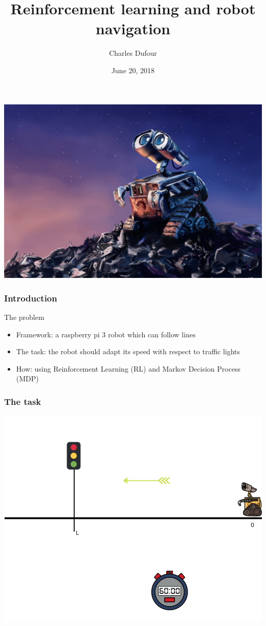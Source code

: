 \documentclass[dvipsnames,svgnames]{beamer}
\author{Charles Dufour}
\title{Reinforcement learning and robot navigation }
\institute{Supervisors: Prof. F. Eisenbrand, Jonas Racine}
\date{June 20, 2018}
\begin{document}
\begin{frame}
\titlepage
\centering
\includegraphics[scale=1]{img/Wall-E.jpg}
\end{frame}




\begin{frame}
\frametitle{Introduction}
\begin{block}{The problem}

  \begin{itemize}
   \item Framework: a raspberry pi 3 robot which can follow lines
   \item The task: the robot should adapt its speed with respect to traffic lights
   \item How: using Reinforcement Learning (RL) and Markov Decision Process (MDP)  
  \end{itemize}
\end{block} 
\end{frame}

\begin{frame}
\frametitle{The task}
\begin{center}
\includegraphics[scale=0.4]{img/illustration_traffic_light.png}
\end{center}
\end{frame}
\end{document}
